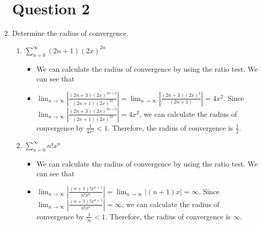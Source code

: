 \documentclass[12pt]{article}
\begin{document}
\begin{enumerate}[leftmargin=\labelsep]
\begin{enumerate}
    \end{enumerate}

    \newpage 
    \section*{Question 2}
    \item Determine the radius of convergence.
    

    \begin{enumerate}


        \item $\displaystyle{\sum_{n=0}^{\infty} (2n+1)(2x)^{2n}}$
        \begin{itemize}[label={}]
            \item We can calculate the radius of convergence by using the ratio test. We can see that
            \item $\displaystyle{\lim_{n \to \infty} \left| \frac{(2n+3)(2x)^{2n+2}}{(2n+1)(2x)^{2n}} \right| = \lim_{n \to \infty} \left| \frac{(2n+3)(2x)^2}{(2n+1)} \right| = 4x^2}$. Since $\displaystyle{\lim_{n \to \infty} \left| \frac{(2n+3)(2x)^{2n+2}}{(2n+1)(2x)^{2n}} \right| = 4x^2}$, we can calculate the radius of convergence by $\displaystyle{\frac{1}{4x^2} < 1}$. Therefore, the radius of convergence is $\displaystyle{\frac{1}{2}}$. 
        \end{itemize}


        \item $\displaystyle{\sum_{n=0}^{\infty} n! x^n}$
        \begin{itemize}[label={}]
            \item We can calculate the radius of convergence by using the ratio test. We can see that
            \item $\displaystyle{\lim_{n \to \infty} \left| \frac{(n+1)! x^{n+1}}{n! x^n} \right| = \lim_{n \to \infty} \left| (n+1) x \right| = \infty}$. Since $\displaystyle{\lim_{n \to \infty} \left| \frac{(n+1)! x^{n+1}}{n! x^n} \right| = \infty}$, we can calculate the radius of convergence by $\displaystyle{\frac{1}{\infty} < 1}$. Therefore, the radius of convergence is $\displaystyle{\infty}$.
        \end{itemize}

    \end{enumerate}


\end{enumerate}
\end{document}
